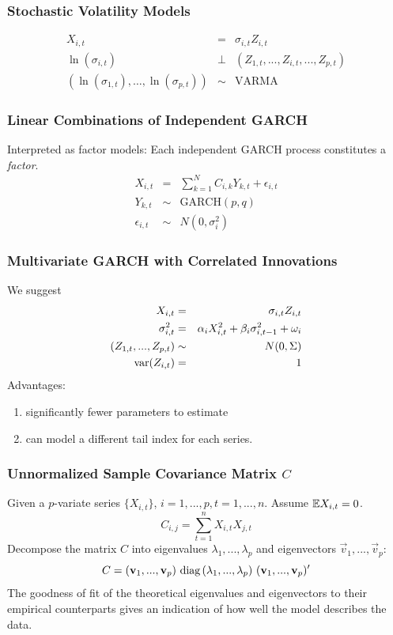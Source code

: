 \documentclass{beamer}
\begin{document}
\begin{frame}
  \frametitle{Stochastic Volatility Models}
  \begin{eqnarray*}
    X_{i,t} &=& \sigma_{i, t} Z_{i, t} \\
    \ln(\sigma_{i,t}) &\bot& (Z_{1, t}, ..., Z_{i, t}, ..., Z_{p,t}) \\
    (\ln(\sigma_{1,t}), \dots, \ln(\sigma_{p,t})) &\sim& \text{VARMA}
  \end{eqnarray*}
\end{frame}

\begin{frame}
  \frametitle{Linear Combinations of Independent GARCH}
  Interpreted as factor models: Each independent GARCH process constitutes a {\it factor}.
  \begin{eqnarray*}
    X_{i, t} &=& \sum_{k=1}^N C_{i,k} Y_{k, t} + \epsilon_{i, t} \\
    Y_{k, t} &\sim& \text{GARCH}(p,q) \\
    \epsilon_{i,t} &\sim& N(0, \sigma_i^2)
  \end{eqnarray*}
\end{frame}

\begin{frame}
  \frametitle{Multivariate GARCH with Correlated Innovations}
  We suggest
  \begin{eqnarray*}
    X_{i, t} &=& \sigma_{i, t} Z_{i, t} \\
    \sigma_{i, t}^2 &=& \alpha_{i} X_{i, t}^2 + \beta_{i} \sigma_{i, t-1}^2 + \omega_i \\
    (Z_{1, t}, ..., Z_{p, t}) &\sim& N(0, \Sigma) \\
    \text{var}(Z_{i,t}) &=& 1
  \end{eqnarray*}
  Advantages:
  \begin{enumerate}
  \item significantly fewer parameters to estimate
  \item can model a different tail index for each series.
  \end{enumerate}
\end{frame}

\begin{frame}
  \frametitle{Unnormalized Sample Covariance Matrix $C$}
  Given a $p$-variate series $\{X_{i, t}\}$, $i=1,...,p, t=1,...,n$.
  Assume $\mathbb{E} X_{i, t} = 0$.
  \[
  C_{i, j} = \sum_{t=1}^n X_{i,t} X_{j,t}
  \]
  Decompose the matrix $C$ into eigenvalues $\lambda_1, ...,
  \lambda_p$ and eigenvectors $\vec v_1, ..., \vec v_p$:
  \[
  C = (\vec v_1, ..., \vec v_p) \ 
  \diag(\lambda_1, ..., \lambda_p) \  
  (\vec v_1, ..., \vec v_p)'
  \]
  The goodness of fit of the theoretical eigenvalues and eigenvectors
  to their empirical counterparts gives an indication of how well the
  model describes the data.
\end{frame}
\end{document}
